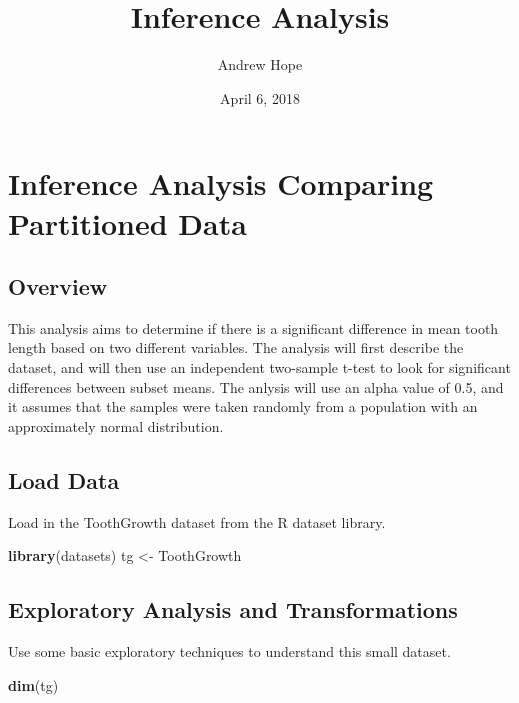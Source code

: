 \documentclass[]{article}
\title{Inference Analysis}
\author{Andrew Hope}
\date{April 6, 2018}
\newenvironment{Shaded}{\begin{snugshade}}{\end{snugshade}}
\newcommand{\KeywordTok}[1]{\textcolor[rgb]{0.13,0.29,0.53}{\textbf{{#1}}}}
\newcommand{\StringTok}[1]{\textcolor[rgb]{0.31,0.60,0.02}{{#1}}}
\newcommand{\NormalTok}[1]{{#1}}
\begin{document}
\maketitle

\section{Inference Analysis Comparing Partitioned
Data}\label{inference-analysis-comparing-partitioned-data}

\subsection{Overview}\label{overview}

This analysis aims to determine if there is a significant difference in
mean tooth length based on two different variables. The analysis will
first describe the dataset, and will then use an independent two-sample
t-test to look for significant differences between subset means. The
anlysis will use an alpha value of 0.5, and it assumes that the samples
were taken randomly from a population with an approximately normal
distribution.

\subsection{Load Data}\label{load-data}

Load in the ToothGrowth dataset from the R dataset library.

\begin{Shaded}
\begin{Highlighting}[]
    \KeywordTok{library}\NormalTok{(datasets)}
    \NormalTok{tg <-}\StringTok{ }\NormalTok{ToothGrowth}
\end{Highlighting}
\end{Shaded}

\subsection{Exploratory Analysis and
Transformations}\label{exploratory-analysis-and-transformations}

Use some basic exploratory techniques to understand this small dataset.

\begin{Shaded}
\begin{Highlighting}[]
    \KeywordTok{dim}\NormalTok{(tg)}
\end{Highlighting}
\end{Shaded}
\end{document}
